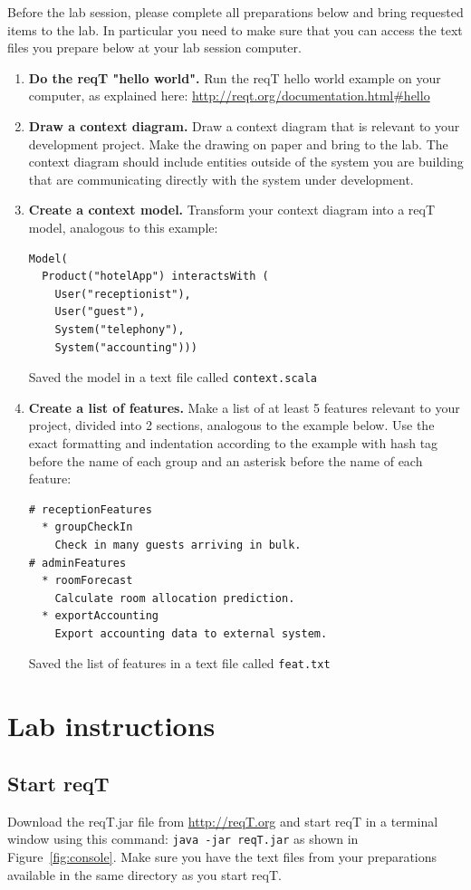 \documentclass[11pt]{article}
\begin{document}
Before the lab session, please complete all preparations below and bring requested items to the lab. In particular you need to make sure that you can access the text files you prepare below at your lab session computer.

\begin{enumerate}
\item {\bf Do the reqT "hello world".} Run the reqT hello world example on your computer, as explained here: \newline \url{http://reqt.org/documentation.html\#hello}
\item {\bf Draw a context diagram.} Draw a context diagram that  is relevant to your development project. Make the drawing on paper and bring to the lab. The context diagram should include entities outside of the system you are building that are communicating directly with the system under development. 
\item {\bf Create a context model.} Transform your context diagram into a reqT model, analogous to this  example: 
{\footnotesize\begin{verbatim}
Model(
  Product("hotelApp") interactsWith (
    User("receptionist"), 
    User("guest"), 
    System("telephony"), 
    System("accounting")))
\end{verbatim}}
Saved the model in a text file called \verb+context.scala+
\item {\bf Create a list of features.} Make a list of at least 5 features relevant to your project, divided into 2 sections, analogous to the example below. Use the exact formatting and indentation according to the example with hash tag before the name of each group and an asterisk before the name of each feature: 
{\footnotesize\begin{verbatim}
# receptionFeatures
  * groupCheckIn
    Check in many guests arriving in bulk.
# adminFeatures
  * roomForecast
    Calculate room allocation prediction.
  * exportAccounting
    Export accounting data to external system.
\end{verbatim}}
Saved the list of features in a text file called \verb+feat.txt+  
\end{enumerate}
\clearpage\newpage

\section{Lab instructions}

\subsection{Start reqT}
Download the reqT.jar file from \url{http://reqT.org} and start reqT in a terminal window using this command: \verb+java -jar reqT.jar+ as shown in Figure~\ref{fig:console}. Make sure you have the text files from your preparations available in the same directory as you start reqT.
\end{document}
